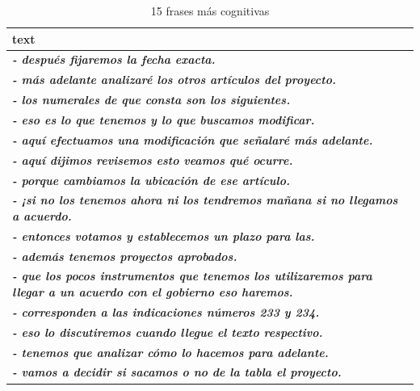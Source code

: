 \documentclass[
  12pt,
]{article}
\begin{document}
\begin{table}[H]

\caption{\label{tab:tabla_frases_cognitivas}15 frases más cognitivas}
\centering
\fontsize{10}{12}\selectfont
\begin{tabular}[t]{>{\raggedright\arraybackslash}p{25em}}
\toprule
text\\
\midrule
\em{\textbf{- después fijaremos la fecha exacta.}}\\
\em{\textbf{- más adelante analizaré los otros artículos del proyecto.}}\\
\em{\textbf{- los numerales de que consta son los siguientes.}}\\
\em{\textbf{- eso es lo que tenemos y lo que buscamos modificar.}}\\
\em{\textbf{- aquí efectuamos una modificación que señalaré más adelante.}}\\
\addlinespace
\em{\textbf{- aquí dijimos revisemos esto veamos qué ocurre.}}\\
\em{\textbf{- porque cambiamos la ubicación de ese artículo.}}\\
\em{\textbf{- ¡si no los tenemos ahora ni los tendremos mañana si no llegamos a acuerdo.}}\\
\em{\textbf{- entonces votamos y establecemos un plazo para las.}}\\
\em{\textbf{- además tenemos proyectos aprobados.}}\\
\addlinespace
\em{\textbf{- que los pocos instrumentos que tenemos los utilizaremos para llegar a un acuerdo con el gobierno eso haremos.}}\\
\em{\textbf{- corresponden a las indicaciones números 233 y 234.}}\\
\em{\textbf{- eso lo discutiremos cuando llegue el texto respectivo.}}\\
\em{\textbf{- tenemos que analizar cómo lo hacemos para adelante.}}\\
\em{\textbf{- vamos a decidir si sacamos o no de la tabla el proyecto.}}\\
\bottomrule
\end{tabular}
\end{table}
\end{document}
